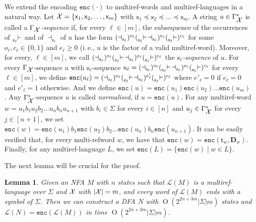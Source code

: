 \documentclass[
a4paper
]{article}
\theoremstyle{plain}
\newtheorem{lemma}[theorem]{Lemma}
\theoremstyle{definition}
\theoremstyle{remark}
\newcommand{\varset}{\mbox{\ensuremath{\mathcal{X}}}}
\DeclareMathOperator{\openmark}{\vdash}
\DeclareMathOperator{\closemark}{\dashv}
\newcommand{\doc}{\ensuremath{\mathbf{D}}}
\newcommand{\open}[1]{\prescript{}{#1}{\openmark}}
\newcommand{\close}[1]{\closemark_{#1}}
\newcommand{\getDoc}[1]{\doc_{#1}}
\newcommand{\getSpanTuple}[1]{\textsf{t}_{#1}}
\newcommand{\varsx}{\ensuremath{\textsf{x}}}
\newcommand{\lang}[1]{\ensuremath{\mathcal{L}(#1)}}
\newcommand{\nrefw}[1]{\ensuremath{\mathtt{enc}(#1)}}
\DeclareMathOperator{\bigo}{O}
\begin{document}
We extend the encoding $\nrefw{\cdot}$ to multiref-words and multiref-languages in a natural way. 
Let $\varset = \{\varsx_1, \varsx_2, \ldots, \varsx_m\}$ with $\varsx_1 \preceq \varsx_2 \preceq \ldots \preceq \varsx_m$. A string $u \in \Gamma_{\varset}^*$ is called a \emph{$\Gamma_{\varset}$-sequence} if, for every $\ell \in [m]$, the subsequence of the occurrences of $\open{\varsx_{\ell}}$ and of $\close{\varsx_{\ell}}$ of $u$ has the form $(\close{\varsx_{\ell}})^{o_{\ell}} (\open{\varsx_{\ell}} \close{\varsx_{\ell}})^{e_{\ell}} (\open{\varsx_{\ell}})^{c_{\ell}}$ for some $o_{\ell}, c_{\ell} \in \{0, 1\}$ and $e_{\ell} \geq 0$ (i.\,e., $u$ is the factor of a valid multiref-word). Moreover, for every, $\ell \in [m]$, we call $(\close{\varsx_{\ell}})^{o_{\ell}} (\open{\varsx_{\ell}} \close{\varsx_{\ell}})^{e_{\ell}} (\open{\varsx_{\ell}})^{c_{\ell}}$ the \emph{$\varsx_\ell$-sequence} of $u$. For every $\Gamma_{\varset}$-sequence $u$ with $\varsx_\ell$-sequence $u_\ell = (\close{\varsx_{\ell}})^{o_{\ell}} (\open{\varsx_{\ell}} \close{\varsx_{\ell}})^{e_{\ell}} (\open{\varsx_{\ell}})^{c_{\ell}}$ for every $\ell \in [m]$, we define $\nrefw{u_\ell} = (\close{\varsx_{\ell}})^{o_{\ell}} (\open{\varsx_{\ell}} \close{\varsx_{\ell}})^{e'_{\ell}} (\open{\varsx_{\ell}})^{c_{\ell}}$ where $e'_\ell = 0$ if $e_\ell = 0$ and $e'_\ell = 1$ otherwise. And we define $\nrefw{u} = \nrefw{u_1} \nrefw{u_2} \ldots \nrefw{u_m}$. Any $\Gamma_{\varset}^*$-sequence $u$ is called \emph{normalised}, if $u = \nrefw{u}$. For any multiref-word $w = u_1 b_1 u_2 b_2 \ldots u_n b_n u_{n+1}$ with $b_i \in \Sigma$ for every $i \in [n]$ and $u_j \in \Gamma_{\varset}^*$ for every $j \in [n + 1]$, we set $\nrefw{w} = \nrefw{u_1} b_1 \nrefw{u_2} b_2 \ldots \nrefw{u_n} b_n \nrefw{u_{n+1}}$. It can be easily verified that, for every multi-refword $w$, we have that $\nrefw{w} = \nrefw{\getSpanTuple{w}, \getDoc{w}}$. Finally, for any multiref-language $L$, we set $\nrefw{L} = \{\nrefw{w} \mid w \in L\}$. 

The next lemma will be crucial for the proof.

\begin{lemma}\label{constructNormDFALemma}
Given an NFA $M$ with $n$ states such that $\lang{M}$ is a multiref-language over $\Sigma$ and $\varset$ with $|\varset| = m$, and every word of $\lang{M}$ ends with a symbol of $\Sigma$. Then we can construct a DFA $N$ with $\bigo(2^{2n+3m} |\Sigma| m)$ states and $\lang{N} = \nrefw{\lang{M}}$ in time $\bigo(2^{2n + 3m} |\Sigma| m)$.
\end{lemma}
\end{document}
